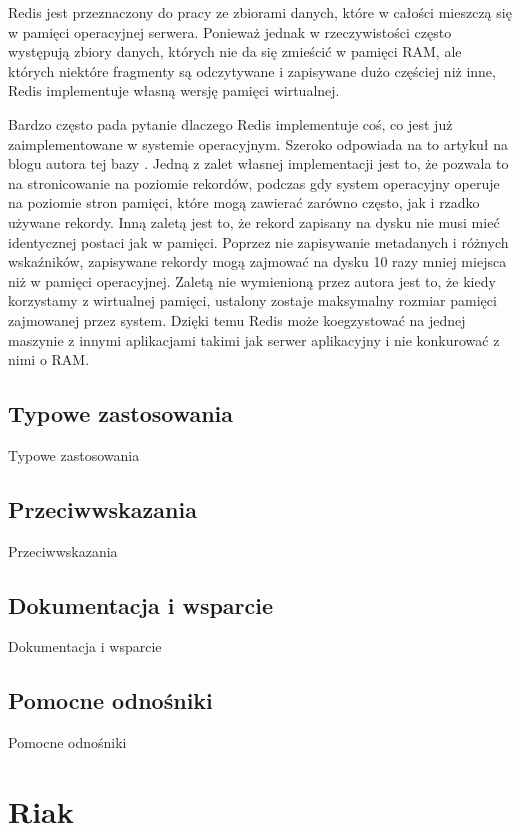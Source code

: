 Redis jest przeznaczony do pracy ze zbiorami danych, które w całości mieszczą się w pamięci operacyjnej serwera.
Ponieważ jednak w rzeczywistości często występują zbiory danych, których nie da się zmieścić w pamięci RAM, ale których niektóre fragmenty są odczytywane i zapisywane dużo częściej niż inne, Redis implementuje własną wersję pamięci wirtualnej.

Bardzo często pada pytanie dlaczego Redis implementuje coś, co jest już zaimplementowane w systemie operacyjnym.
Szeroko odpowiada na to artykuł na blogu autora tej bazy \cite{antirez-redis-vm}.
Jedną z zalet własnej implementacji jest to, że pozwala to na stronicowanie na poziomie rekordów, podczas gdy system operacyjny operuje na poziomie stron pamięci, które mogą zawierać zarówno często, jak i rzadko używane rekordy.
Inną zaletą jest to, że rekord zapisany na dysku nie musi mieć identycznej postaci jak w pamięci.
Poprzez nie zapisywanie metadanych i różnych wskaźników, zapisywane rekordy mogą zajmować na dysku 10 razy mniej miejsca niż w pamięci operacyjnej.
Zaletą nie wymienioną przez autora jest to, że kiedy korzystamy z wirtualnej pamięci, ustalony zostaje maksymalny rozmiar pamięci zajmowanej przez system.
Dzięki temu Redis może koegzystować na jednej maszynie z innymi aplikacjami takimi jak serwer aplikacyjny i nie konkurować z nimi o RAM.

\subsection*{Typowe zastosowania}

Typowe zastosowania

\subsection*{Przeciwwskazania}

Przeciwwskazania

\subsection*{Dokumentacja i wsparcie}

Dokumentacja i wsparcie

\subsection*{Pomocne odnośniki}
 
Pomocne odnośniki

\section{Riak}
\label{sec:riak}

